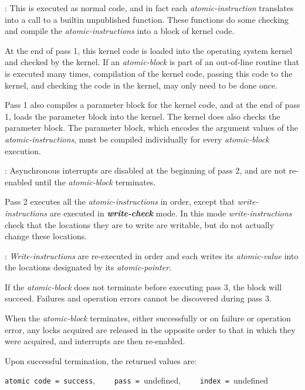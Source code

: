 \documentclass[12pt]{article}
\newcommand{\key}[1]{{\bf \em #1}\index{#1}}
\newenvironment{indpar}[1][0.3in]%
	{\begin{list}{}%
		     {\setlength{\itemsep}{0in}%
		      \setlength{\topsep}{0in}%
		      \setlength{\parsep}{1ex}%
		      \setlength{\labelwidth}{#1}%
		      \setlength{\leftmargin}{#1}%
		      \addtolength{\leftmargin}{\labelsep}}%
	 \item}%
	{\end{list}}
\begin{document}
\begin{indpar}[0.6in]
\hspace*{-0.3in}{\bf Pass 1, Compilation Pass}:
This is executed as normal code, and in fact each {\em atomic-instruction}
translates into a call to a builtin unpublished function.  These functions
do some checking and compile the {\em atomic-instructions} into a block
of kernel code.

At the end of pass 1, this kernel code is loaded into the operating
system kernel and checked by the kernel.
If an {\em atomic-block}
is part of an out-of-line routine that is executed many times, compilation
of the kernel code, passing this code to the kernel, and checking the
code in the kernel, may only need to be done once.

Pass 1 also compiles a parameter block for the kernel code, and at the end
of pass 1, loads the parameter block into the kernel.  The kernel does
also checks the parameter block.  The parameter block, which encodes the
argument values of the {\em atomic-instructions}, must be compiled
individually for every
{\em atomic-block} execution.

\hspace*{-0.3in}{\bf Pass 2, Test Pass}: Asynchronous interrupts are
disabled at the beginning of pass 2, and are not re-enabled until
the {\em atomic-block} terminates.

Pass 2 executes all the {\em atomic-instructions} in order, except that
{\em write-instructions} are executed in \key{write-check} mode.
In this mode {\em write-instructions} check that the locations
they are to write are writable, but do not actually change these locations.

\hspace*{-0.3in}{\bf Pass 3, Write Pass}: 
{\em Write-instructions} are re-executed in order and each writes its
{\em atomic-value} into the locations designated by its
{\em atomic-pointer}.

If the {\em atomic-block} does not
terminate before executing pass 3, the block will succeed.
Failures and operation errors cannot be discovered during pass 3.

When the {\em atomic-block} terminates, either successfully or
on failure or operation error,
any locks acquired are released in the opposite order
to that in which they were acquired, and interrupts are then re-enabled.

Upon successful termination, the returned values are:
\begin{center}
{\tt atomic code = success},~~~~ {\tt pass = }undefined,~~~~
{\tt index = }undefined
\end{center}
\end{indpar}
\end{document}

